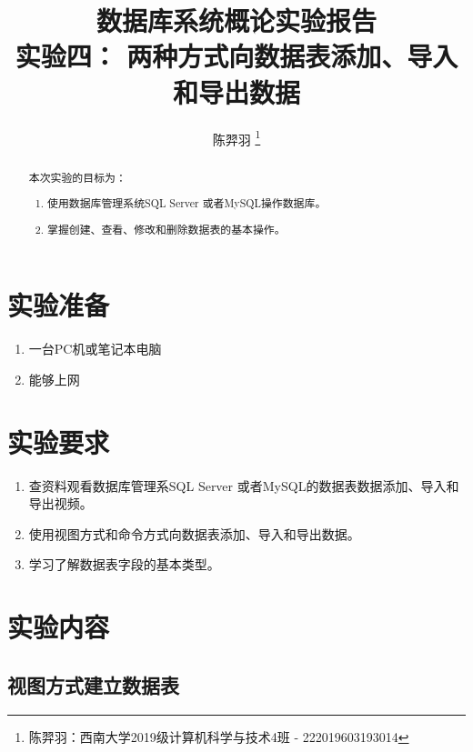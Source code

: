 \documentclass[a4paper,UTF8,heading=false,12pt]{article}
\newcommand\subtitle[1]{{\small #1}}
\begin{document}
\title{
    数据库系统概论实验报告 \\
    \subtitle{实验四： 两种方式向数据表添加、导入和导出数据}
}
\author{陈羿羽 \thanks{陈羿羽：西南大学2019级计算机科学与技术4班 - 222019603193014}}
\maketitle

\begin{abstract}
    本次实验的目标为：
    \begin{enumerate}
        \item 使用数据库管理系统SQL Server 或者MySQL操作数据库。
        \item 掌握创建、查看、修改和删除数据表的基本操作。
    \end{enumerate}
\end{abstract}

\newpage

\section{实验准备}

\begin{enumerate}
    \item 一台PC机或笔记本电脑
    \item 能够上网
\end{enumerate}

\section{实验要求}

\begin{enumerate}
    \item 查资料观看数据库管理系SQL Server 或者MySQL的数据表数据添加、导入和导出视频。
    \item 使用视图方式和命令方式向数据表添加、导入和导出数据。
    \item 学习了解数据表字段的基本类型。
\end{enumerate}

\section{实验内容}

\subsection{视图方式建立数据表}
\end{document}
